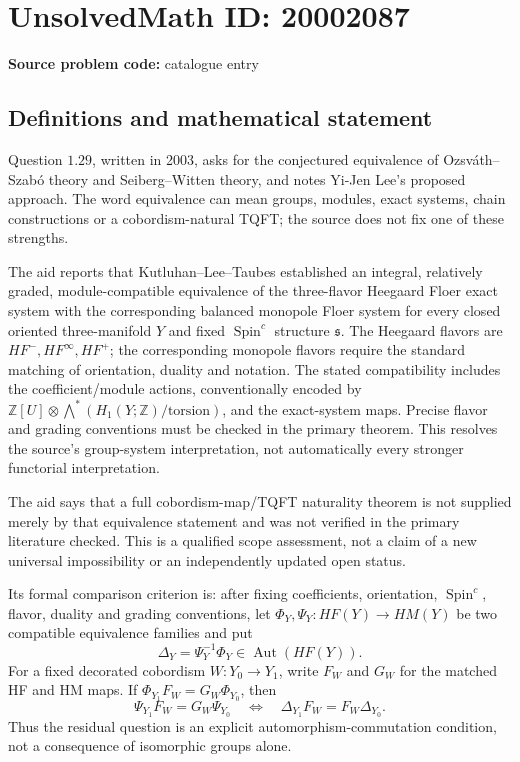 \documentclass[11pt]{article}
\newcommand{\Z}{\mathbb{Z}}
\begin{document}
\section*{UnsolvedMath ID: 20002087}
\textbf{Source problem code:} catalogue entry
\subsection{Definitions and mathematical statement}
Question \(1.29\), written in 2003, asks for the conjectured equivalence of Ozsv\'ath--Szab\'o theory and Seiberg--Witten theory, and notes Yi-Jen Lee's proposed approach. The word equivalence can mean groups, modules, exact systems, chain constructions or a cobordism-natural TQFT; the source does not fix one of these strengths.

The aid reports that Kutluhan--Lee--Taubes established an integral, relatively graded, module-compatible equivalence of the three-flavor Heegaard Floer exact system with the corresponding balanced monopole Floer system for every closed oriented three-manifold \(Y\) and fixed \(\operatorname{Spin}^c\) structure \(\mathfrak s\). The Heegaard flavors are \(HF^-,HF^\infty,HF^+\); the corresponding monopole flavors require the standard matching of orientation, duality and notation. The stated compatibility includes the coefficient/module actions, conventionally encoded by \(\Z[U]\otimes\bigwedge^*(H_1(Y;\Z)/\mathrm{torsion})\), and the exact-system maps. Precise flavor and grading conventions must be checked in the primary theorem. This resolves the source's group-system interpretation, not automatically every stronger functorial interpretation.

The aid says that a full cobordism-map/TQFT naturality theorem is not supplied merely by that equivalence statement and was not verified in the primary literature checked. This is a qualified scope assessment, not a claim of a new universal impossibility or an independently updated open status.

Its formal comparison criterion is: after fixing coefficients, orientation, \(\operatorname{Spin}^c\), flavor, duality and grading conventions, let
\(\Phi_Y,\Psi_Y:HF(Y)\to HM(Y)\)
be two compatible equivalence families and put
\[
 \Delta_Y=\Psi_Y^{-1}\Phi_Y\in\operatorname{Aut}(HF(Y)).
\]
For a fixed decorated cobordism \(W:Y_0\to Y_1\), write \(F_W\) and \(G_W\) for the matched HF and HM maps. If \(\Phi_{Y_1}F_W=G_W\Phi_{Y_0}\), then
\[
 \Psi_{Y_1}F_W=G_W\Psi_{Y_0}
 \quad\Longleftrightarrow\quad
 \Delta_{Y_1}F_W=F_W\Delta_{Y_0}.
\]
Thus the residual question is an explicit automorphism-commutation condition, not a consequence of isomorphic groups alone.
\end{document}
